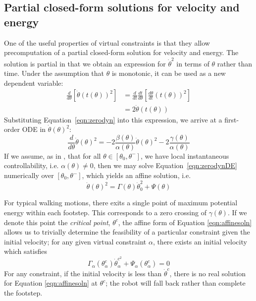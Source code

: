 \subsection{Partial closed-form solutions for velocity and energy} \label{sec:partialsol}
One of the useful properties of virtual constraints is that they allow precomputation of a partial closed-form solution for velocity and energy. The solution is partial in that we obtain an expression for $\dot{\theta}^2$ in terms of $\theta$ rather than time. Under the assumption that $\theta$ is monotonic, it can be used as a new dependent variable:
\begin{align*}
	\frac{d}{d\theta}\left[\dot{\theta}\left(t(\theta)\right)^2\right] &= 
	\frac{d}{dt}\frac{dt}{d\theta}\left[\frac{d\theta}{dt}\left(t(\theta)\right)^2\right] \nonumber \\ 
	&= 2\ddot{\theta}\left(t(\theta)\right)
\end{align*}
Substituting Equation~\ref{eqn:zerodyn} into this expression, we arrive at a first-order ODE in $\dot{\theta}(\theta)^2$:
\begin{equation}\label{eqn:zerodynDE}
	\frac{d}{d\theta}\dot{\theta}(\theta)^2 = -2\frac{\beta(\theta)}{\alpha(\theta)}
		\dot{\theta}(\theta)^2 - 2\frac{\gamma(\theta)}{\alpha(\theta)}
\end{equation}
If we assume, as in \cite{manchester13planning}, that for all $\theta \in [\theta_0, \theta^-]$, we have local instantaneous controllability, i.e. $\alpha(\theta) \neq 0$, then we may solve Equation~\ref{eqn:zerodynDE} numerically over $[\theta_0, \theta^-]$, which yields an affine solution, i.e.
\begin{equation} \label{eqn:affinesoln}
	\dot{\theta}(\theta)^2 = \Gamma(\theta)\dot{\theta}_0^2 + \Psi(\theta)
\end{equation}

For typical walking motions, there exits a single point of maximum potential energy within each footstep. This corresponds to a zero crossing of $\gamma(\theta)$. If we denote this point the \textit{critical point}, $\theta^c$, the affine form of Equation \ref{eqn:affinesoln} allows us to trivially determine the feasibility of a particular constraint given the initial velocity; for any given virtual constraint $\alpha$, there exists an initial velocity which satisfies
\begin{equation} \label{eqn:critvel}
	\Gamma_\alpha(\theta_\alpha^c)\dot{\theta}_\alpha^{c^2} + \Psi_\alpha(\theta_\alpha^c) = 0
\end{equation}
For any constraint, if the initial velocity is less than $\dot{\theta}^c$, there is no real solution for Equation \ref{eqn:affinesoln} at $\theta^c$; the robot will fall back rather than complete the footstep.

